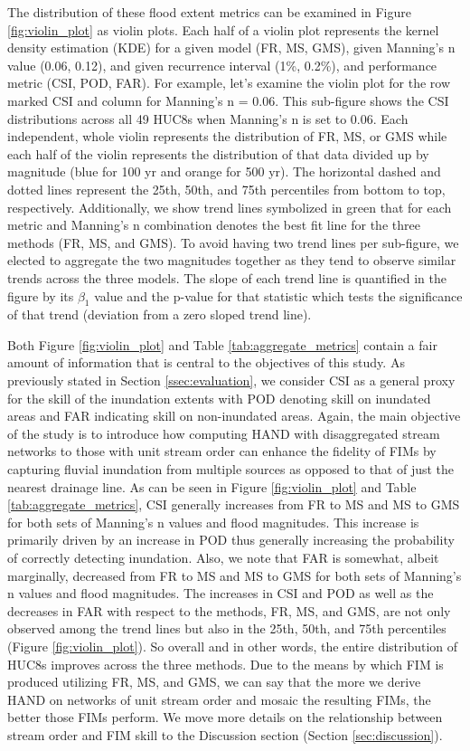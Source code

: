 \documentclass[draft]{dependencies/agujournal2019}
\begin{document}
The distribution of these flood extent metrics can be examined in Figure \ref{fig:violin_plot} as violin plots.
Each half of a violin plot represents the kernel density estimation (KDE) for a given model (FR, MS, GMS), given Manning's n value (0.06, 0.12), and given recurrence interval (1\%, 0.2\%), and performance metric (CSI, POD, FAR).
For example, let's examine the violin plot for the row marked CSI and column for Manning's n = 0.06.
This sub-figure shows the CSI distributions across all 49 HUC8s when Manning's n is set to 0.06.
Each independent, whole violin represents the distribution of FR, MS, or GMS while each half of the violin represents the distribution of that data divided up by magnitude (blue for 100 yr and orange for 500 yr).
The horizontal dashed and dotted lines represent the 25th, 50th, and 75th percentiles from bottom to top, respectively.
Additionally, we show trend lines symbolized in green that for each metric and Manning's n combination denotes the best fit line for the three methods (FR, MS, and GMS).
To avoid having two trend lines per sub-figure, we elected to aggregate the two magnitudes together as they tend to observe similar trends across the three models.
The slope of each trend line is quantified in the figure by its $\beta_1$ value and the p-value for that statistic which tests the significance of that trend (deviation from a zero sloped trend line).

Both Figure \ref{fig:violin_plot} and Table \ref{tab:aggregate_metrics} contain a fair amount of information that is central to the objectives of this study.
As previously stated in Section \ref{ssec:evaluation}, we consider CSI as a general proxy for the skill of the inundation extents with POD denoting skill on inundated areas and FAR indicating skill on non-inundated areas.
Again, the main objective of the study is to introduce how computing HAND with disaggregated stream networks to those with unit stream order can enhance the fidelity of FIMs by capturing fluvial inundation from multiple sources as opposed to that of just the nearest drainage line.
As can be seen in Figure \ref{fig:violin_plot} and Table \ref{tab:aggregate_metrics}, CSI generally increases from FR to MS and MS to GMS for both sets of Manning's n values and flood magnitudes.
This increase is primarily driven by an increase in POD thus generally increasing the probability of correctly detecting inundation.
Also, we note that FAR is somewhat, albeit marginally, decreased from FR to MS and MS to GMS for both sets of Manning's n values and flood magnitudes.
The increases in CSI and POD as well as the decreases in FAR with respect to the methods, FR, MS, and GMS, are not only observed among the trend lines but also in the 25th, 50th, and 75th percentiles (Figure \ref{fig:violin_plot}).
So overall and in other words, the entire distribution of HUC8s improves across the three methods.
Due to the means by which FIM is produced utilizing FR, MS, and GMS, we can say that the more we derive HAND on networks of unit stream order and mosaic the resulting FIMs, the better those FIMs perform.
We move more details on the relationship between stream order and FIM skill to the Discussion section (Section \ref{sec:discussion}).
\end{document}
